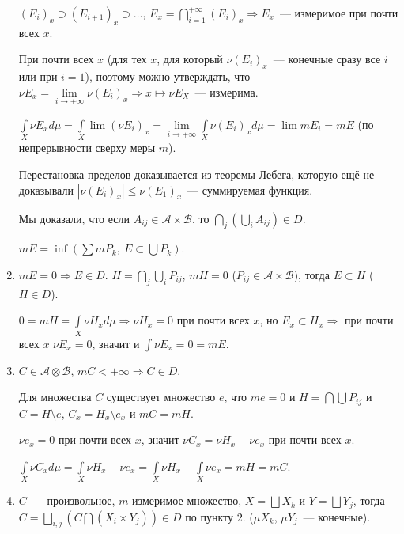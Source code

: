 \documentclass{article}
\begin{document}
\begin{enumerate}
                    $(E_i)_x \supset (E_{i + 1})_x \supset \ldots$, $E_x = \bigcap\limits^{+\infty}_{i = 1} (E_i)_x \Rightarrow E_x$~--- измеримое при почти всех $x$.
                    
                    При почти всех $x$ (для тех $x$, для который $\nu (E_i)_x$~--- конечные сразу все $i$ или при $i = 1$), поэтому можно утверждать, что $\nu E_x = \lim\limits_{i \rightarrow +\infty} \nu (E_i)_x \Rightarrow x\mapsto \nu E_X$~--- измерима.
                    
                    $\int\limits_{X} \nu E_x d \mu = \int\limits_{X} \lim (\nu E_i)_x = \lim\limits_{i \rightarrow +\infty} \int\limits_{X} \nu (E_i)_x d \mu = \lim m E_i = m E$ (по непрерывности сверху меры $m$).
                    
                    Перестановка пределов доказывается из теоремы Лебега, которую ещё не доказывали $|\nu (E_i)_x | \leqslant \nu (E_1)_x$~--- суммируемая функция.
                    
                    Мы доказали, что если $A_{ij} \in \mathcal{A} \times \mathcal{B}$, то $\bigcap\limits_{j} \left( \bigcup\limits_{i} A_{ij} \right) \in D$.
        
                    $m E = \inf \left( \sum m P_k, \ E \subset \bigcup P_k \right)$.
    
                \item $m E = 0 \Rightarrow E \in D$. $H = \bigcap\limits_{j} \bigcup\limits_{i} P_{ij}$, $m H = 0$ ($P_{ij} \in \mathcal{A} \times \mathcal{B}$), тогда $E \subset H$ ($H \in D$).
                
                    $0 = m H = \int\limits_{X} \nu H_x d \mu \Rightarrow \nu H_x = 0$ при почти всех $x$, но $E_x \subset H_x \Rightarrow$ при почти всех $x$ $\nu E_x = 0$, значит и $\int \nu E_x = 0 = m E$.
                    
                \item $C \in \mathcal{A} \otimes \mathcal{B}$, $m C < +\infty \Rightarrow C \in D$.
                
                    Для множества $C$ существует множество $e$, что $m e = 0$ и $H = \bigcap \bigcup P_{ij}$ и $C = H \setminus e$, $C_x = H_x \setminus e_x$ и $m C = m H$.
                    
                    $\nu e_x = 0$ при почти всех $x$, значит $\nu C_x = \nu H_x - \nu e_x$ при почти всех $x$.
                    
                    $\int\limits_{X} \nu C_x d \mu = \int\limits_{X} \nu H_x - \nu e_x = \int\limits_{X} \nu H_x - \int\limits_{X} \nu e_x = mH = m C$.
                    
                \item $C$~--- произвольное, $m$-измеримое множество, $X = \bigsqcup X_k$ и $Y = \bigsqcup Y_j$, тогда $C = \bigsqcup\limits_{i, j} \left( C \bigcap \left( X_i \times Y_j \right) \right) \in D$ по пункту $2$. ($\mu X_k$, $\mu Y_j$~--- конечные).
                
            \end{enumerate}
        
\end{document}
